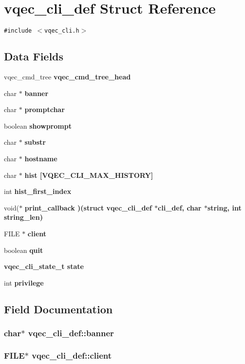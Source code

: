 \section{vqec\_\-cli\_\-def Struct Reference}
\label{structvqec__cli__def}
{\tt \#include $<$vqec\_\-cli.h$>$}

\subsection*{Data Fields}
\begin{CompactItemize}
\item 
vqec\_\-cmd\_\-tree \bf{vqec\_\-cmd\_\-tree\_\-head}
\item 
char $\ast$ \bf{banner}
\item 
char $\ast$ \bf{promptchar}
\item 
boolean \bf{showprompt}
\item 
char $\ast$ \bf{substr}
\item 
char $\ast$ \bf{hostname}
\item 
char $\ast$ \bf{hist} [VQEC\_\-CLI\_\-MAX\_\-HISTORY]
\item 
int \bf{hist\_\-first\_\-index}
\item 
void($\ast$ \bf{print\_\-callback} )(struct \bf{vqec\_\-cli\_\-def} $\ast$cli\_\-def, char $\ast$string, int string\_\-len)
\item 
FILE $\ast$ \bf{client}
\item 
boolean \bf{quit}
\item 
\bf{vqec\_\-cli\_\-state\_\-t} \bf{state}
\item 
int \bf{privilege}
\end{CompactItemize}


\subsection{Field Documentation}
\subsubsection{\setlength{\rightskip}{0pt plus 5cm}char$\ast$ \bf{vqec\_\-cli\_\-def::banner}}\label{structvqec__cli__def_0337d2e9b33bfa5d61abf6873550bf8f}


\subsubsection{\setlength{\rightskip}{0pt plus 5cm}FILE$\ast$ \bf{vqec\_\-cli\_\-def::client}}\label{structvqec__cli__def_4bd6a141756007eaf212fbb2dd7e826a}


